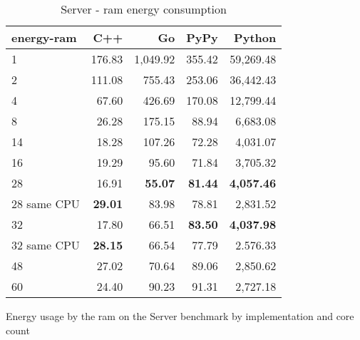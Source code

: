 \begin{table}[H]
    \centering
    \begin{tabular}{lrrrr}
        \hline
        energy-ram   & C++             & Go                & PyPy                & Python            \\
        \hline      
        1            &   176.83        & 1,049.92          &   355.42            &  59,269.48        \\
        2            &   111.08        &   755.43          &   253.06            &  36,442.43        \\
        4            &    67.60        &   426.69          &   170.08            &  12,799.44        \\
        8	           &    26.28 	     &   175.15          &    88.94            &	  6,683.08       \\
        14           &    18.28        &   107.26          &    72.28            &   4,031.07        \\
        16           &    19.29        &    95.60          &    71.84            &   3,705.32        \\
        28           &    16.91        &    \textbf{55.07} &    \textbf{81.44}   & \textbf{4,057.46} \\
        28 same CPU  & \textbf{29.01}  &    83.98          &    78.81            &   2,831.52        \\
        32           &    17.80        &    66.51          &    \textbf{83.50}   & \textbf{4,037.98} \\
        32 same CPU  & \textbf{28.15}  &    66.54          &    77.79            &   2.576.33        \\
        48           &    27.02        &    70.64          &    89.06            &   2,850.62        \\
        60           &    24.40        &    90.23          &    91.31            &   2,727.18        \\
        \hline
    \end{tabular}
\caption{Server - \gls{ram} energy consumption}{Energy usage by the \gls{ram} on the Server benchmark by implementation and core count}
\label{tab:server-energy-ram}
\end{table}

